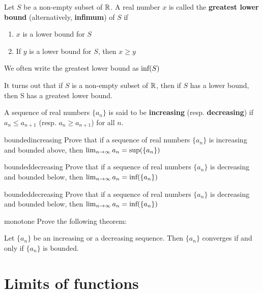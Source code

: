 \begin{definition}
Let $S$ be a non-empty subset of $\mathbb{R}$.  A real number $x$ is called the \textbf{greatest lower bound} (alternatively, \textbf{infimum}) of $S$ if
\begin{enumerate}
    \item $x$ is a lower bound for $S$
    \item If $y$ is a lower bound for $S$, then $x \geq y$
\end{enumerate}

We often write the greatest lower  bound as $\textnormal{inf}(S)$
\end{definition}

It turns out that if $S$ is a non-empty subset of $\mathbb{R}$, then if $S$ has a lower bound, then S has a greatest lower bound.


\begin{definition}
    A sequence of real numbers $\{a_n\}$ is said to be \textbf{increasing} (resp. \textbf{decreasing}) if $a_n \leq a_{n+1}$ (resp. $a_n \geq a_{n+1}$) for all $n$.
    \end{definition}
    
\begin{problem}{boundedincreasing}
Prove that if a sequence of real numbers $\{a_n\}$ is increasing and bounded above, then $\lim_{n \to \infty} a_n = \textnormal{sup}(\{a_n\})$
\end{problem}

\begin{problem}{boundeddecreasing}
Prove that if a sequence of real numbers $\{a_n\}$ is decreasing and bounded below, then $\lim_{n \to \infty} a_n = \textnormal{inf}(\{a_n\})$
\end{problem}

\begin{problem}{boundeddecreasing}
Prove that if a sequence of real numbers $\{a_n\}$ is decreasing and bounded below, then $\lim_{n \to \infty} a_n = \textnormal{inf}(\{a_n\})$
\end{problem}

\begin{problem}{monotone}
Prove the following theorem:

Let $\{a_n\}$ be an increasing or a decreasing sequence.  Then $\{a_n\}$ converges if and only if $\{a_n\}$ is bounded.
\end{problem}

\section{Limits of functions}




